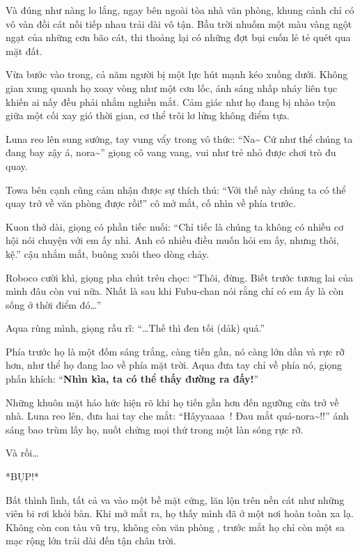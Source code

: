\documentclass[../main.tex]{subfiles}
\begin{document}
Và đúng như nàng lo lắng, ngay bên ngoài tòa nhà văn phòng, khung cảnh chỉ có vô vàn đồi cát nối tiếp nhau trải dài vô tận. Bầu trời nhuốm một màu vàng ngột ngạt của những cơn bão cát, thi thoảng lại có những đợt bụi cuốn lẻ tẻ quét qua mặt đất.

\ct

Vừa bước vào trong, cả năm người bị một lực hút mạnh kéo xuống dưới. Không gian xung quanh họ xoay vòng như một cơn lốc, ánh sáng nhấp nháy liên tục khiến ai nấy đều phải nhắm nghiền mắt. Cảm giác như họ đang bị nhào trộn giữa một cối xay gió thời gian, cơ thể trôi lơ lửng không điểm tựa.

Luna reo lên sung sướng, tay vung vẩy trong vô thức: ``Na\~{} Cứ như thể chúng ta đang bay zậy á, nora\~{}'' giọng cô vang vang, vui như trẻ nhỏ được chơi trò đu quay.

Towa bên cạnh cũng cảm nhận được sự thích thú: ``Với thế này chúng ta có thể quay trở về văn phòng được rồi!'' cô mở mắt, cố nhìn về phía trước.

Kuon thở dài, giọng có phần tiếc nuối: ``Chỉ tiếc là chúng ta không có nhiều cơ hội nói chuyện với em ấy nhỉ. Anh có nhiều điều muốn hỏi em ấy, nhưng thôi, kệ.'' cậu nhắm mắt, buông xuôi theo dòng chảy.

Roboco cười khì, giọng pha chút trêu chọc: ``Thôi, đừng. Biết trước tương lai của mình đâu còn vui nữa. Nhất là sau khi Fubu-chan nói rằng chỉ có em ấy là còn sống ở thời điểm đó\dots''

Aqua rùng mình, giọng rầu rĩ: ``\dots Thế thì đen tối (dảk) quá.''

Phía trước họ là một đốm sáng trắng, càng tiến gần, nó càng lớn dần và rực rỡ hơn, như thể họ đang lao về phía mặt trời. Aqua đưa tay chỉ về phía nó, giọng phấn khích: ``\textbf{Nhìn kìa, ta có thể thấy đường ra đấy!}''


Những khuôn mặt háo hức hiện rõ khi họ tiến gần hơn đến ngưỡng cửa trở về nhà. Luna reo lên, đưa hai tay che mắt: ``Hâyyaaaa~! Đau mắt quá-nora\~{}!!'' ánh sáng bao trùm lấy họ, nuốt chửng mọi thứ trong một làn sóng rực rỡ.

Và rồi\dots

*BỤP!*

Bất thình lình, tất cả va vào một bề mặt cứng, lăn lộn trên nền cát như những viên bi rơi khỏi bàn. Khi mở mắt ra, họ thấy mình đã ở một nơi hoàn toàn xa lạ. Không còn con tàu vũ trụ, không còn văn phòng \hll, trước mắt họ chỉ còn một sa mạc rộng lớn trải dài đến tận chân trời.
\end{document}

